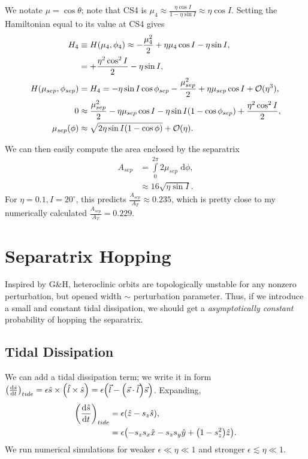 \documentclass[11pt,
        usenames, %
        dvipsnames %
    ]{article}
\newcommand*{\rd}[2]{\frac{\mathrm{d}#1}{\mathrm{d}#2}}
\DeclarePairedDelimiter\p{\lparen}{\rparen}
\begin{document}
We notate $\mu = \cos\theta$; note that CS4 is $\mu_4 \approx \frac{\eta \cos
I}{1 - \eta \sin I} \approx \eta \cos I$. Setting the Hamiltonian equal to its
value at CS4 gives
\begin{align*}
    H_4 &\equiv H\p*{\mu_4, \phi_4}
        \approx -\frac{\mu_4^2}{2} + \eta \mu_4 \cos I - \eta \sin I,\\
        &= +\frac{\eta^2\cos^2 I}{2} - \eta \sin I,\\
    H(\mu_{sep}, \phi_{sep})
        &= H_4 = -\eta \sin I \cos \phi_{sep} - \frac{\mu_{sep}^2}{2} + \eta
            \mu_{sep} \cos I + \mathcal{O}(\eta^3),\\
    0 &\approx \frac{\mu_{sep}^2}{2} - \eta \mu_{sep} \cos I
        - \eta \sin I\p*{1 - \cos \phi_{sep}} + \frac{\eta^2\cos^2I}{2},\\
    \mu_{sep}\p*{\phi} &\approx \sqrt{2\eta \sin I\p*{1 - \cos \phi}}
        + \mathcal{O}(\eta).
\end{align*}

We can then easily compute the area enclosed by the separatrix
\begin{align}
    A_{sep} &= \int\limits_0^{2\pi}2\mu_{sep}\;\mathrm{d}\phi,\nonumber\\
        &\approx 16\sqrt{\eta \sin I}.
\end{align}
For $\eta = 0.1, I = 20^\circ$, this predicts $\frac{A_{sep}}{A_{T}} \approx
0.235$, which is pretty close to my numerically calculated $\frac{A_{sep}}{A_T}
= 0.229$.

\section{Separatrix Hopping}

Inspired by G\&H, heteroclinic orbits are topologically unstable for any nonzero
perturbation, but opened width $\sim$ perturbation parameter. Thus, if we
introduce a small and constant tidal dissipation, we should get a
\emph{asymptotically constant} probability of hopping the separatrix.

\subsection{Tidal Dissipation}

We can add a tidal dissipation term; we write it in form
$\p*{\rd{\hat{s}}{t}}_{tide} = \epsilon \hat{s} \times \p*{\hat{l} \times
\hat{s}} = \epsilon\p*{\vec{l} - \p*{\vec{s} \cdot \vec{l}}\vec{s}}$. Expanding,
\begin{align}
    \p*{\rd{\hat{s}}{t}}_{tide} &= \epsilon \p*{\hat{z} - s_z\hat{s}}
        ,\nonumber\\
        &= \epsilon \p*{-s_z s_x\hat{x} - s_zs_y\hat{y} + \p*{1 - s_z^2}
            \hat{z}}.\label{eq:p1_eom}
\end{align}
We run numerical simulations for weaker $\epsilon \ll \eta \ll 1$ and stronger
$\epsilon \lesssim \eta \ll 1$.
\end{document}
